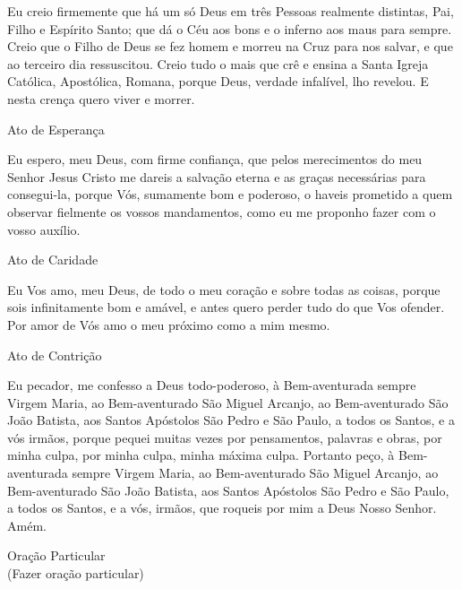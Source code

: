 \documentclass{book}
\begin{document}
\begin{flushleft}
    Eu creio firmemente que há um só Deus em três Pessoas realmente distintas, Pai, Filho e Espírito Santo; que dá o Céu aos bons e o inferno aos maus para sempre. Creio que o Filho de Deus se fez homem e morreu na Cruz para nos salvar, e que ao terceiro dia ressuscitou. Creio tudo o mais que crê e ensina a Santa Igreja Católica, Apostólica, Romana, porque Deus, verdade infalível, lho revelou. E nesta crença quero viver e morrer.
\end{flushleft}
\begin{center}
    Ato de Esperança
\end{center}
\begin{flushleft}
    Eu espero, meu Deus, com firme confiança, que pelos merecimentos do meu Senhor Jesus Cristo me dareis a salvação eterna e as graças necessárias para consegui-la, porque Vós, sumamente bom e poderoso, o haveis prometido a quem observar fielmente os vossos mandamentos, como eu me proponho fazer com o vosso auxílio.
\end{flushleft}
\begin{center}
    Ato de Caridade
\end{center}
\begin{flushleft}
    Eu Vos amo, meu Deus, de todo o meu coração e sobre todas as coisas, porque sois infinitamente bom e amável, e antes quero perder tudo do que Vos ofender. Por amor de Vós amo o meu próximo como a mim mesmo.
\end{flushleft}
\newpage
\begin{center}
    Ato de Contrição
\end{center}
\begin{flushleft}
    Eu pecador, me confesso a Deus todo-poderoso, à Bem-aventurada sempre Virgem Maria, ao Bem-aventurado São Miguel Arcanjo, ao Bem-aventurado São João Batista, aos Santos Apóstolos São Pedro e São Paulo, a todos os Santos, e a vós irmãos, porque pequei muitas vezes por pensamentos, palavras e obras, por minha culpa, por minha culpa, minha máxima culpa. Portanto peço, à Bem-aventurada sempre Virgem Maria, ao Bem-aventurado São Miguel Arcanjo, ao Bem-aventurado São João Batista, aos Santos Apóstolos São Pedro e São Paulo, a todos os Santos, e a vós, irmãos, que roqueis por mim a Deus Nosso Senhor. Amém.
\end{flushleft}
\begin{center}
    Oração Particular \\ \textcolor{VioletRed2}{\scriptsize{(Fazer oração particular)}}
\end{center}
\end{document}
